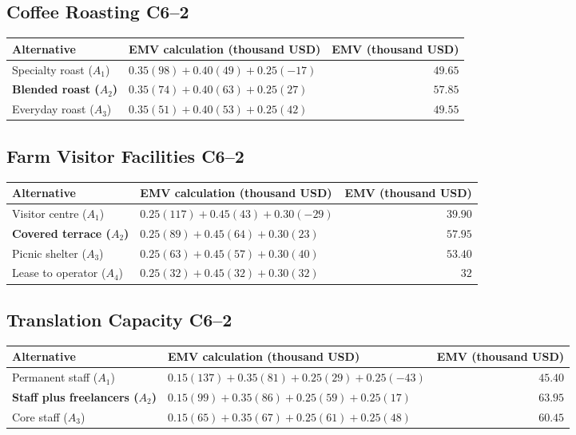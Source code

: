 {\subsection{Coffee Roasting \hfill C6--2}
\label{summary:coffee-roasting}
\begin{center}
\begin{tabular}{@{}llr@{}}\toprule
Alternative & EMV calculation (thousand USD) & EMV (thousand USD)\\\midrule
Specialty roast ($A_1$) & $0.35(98)+0.40(49)+0.25(-17)$ & $49.65$\\
\textbf{Blended roast ($A_2$)} & $0.35(74)+0.40(63)+0.25(27)$ & $\boldsymbol{57.85}$\\
Everyday roast ($A_3$) & $0.35(51)+0.40(53)+0.25(42)$ & $49.55$\\
\bottomrule\end{tabular}
\end{center}
\subsection{Farm Visitor Facilities \hfill C6--2}
\label{summary:farm-visitor-facilities}
\begin{center}
\begin{tabular}{@{}llr@{}}\toprule
Alternative & EMV calculation (thousand USD) & EMV (thousand USD)\\\midrule
Visitor centre ($A_1$) & $0.25(117)+0.45(43)+0.30(-29)$ & $39.90$\\
\textbf{Covered terrace ($A_2$)} & $0.25(89)+0.45(64)+0.30(23)$ & $\boldsymbol{57.95}$\\
Picnic shelter ($A_3$) & $0.25(63)+0.45(57)+0.30(40)$ & $53.40$\\
Lease to operator ($A_4$) & $0.25(32)+0.45(32)+0.30(32)$ & $32$\\
\bottomrule\end{tabular}
\end{center}
\subsection{Translation Capacity \hfill C6--2}
\label{summary:translation-capacity}
\begin{center}
\begin{tabular}{@{}llr@{}}\toprule
Alternative & EMV calculation (thousand USD) & EMV (thousand USD)\\\midrule
Permanent staff ($A_1$) & $0.15(137)+0.35(81)+0.25(29)+0.25(-43)$ & $45.40$\\
\textbf{Staff plus freelancers ($A_2$)} & $0.15(99)+0.35(86)+0.25(59)+0.25(17)$ & $\boldsymbol{63.95}$\\
Core staff ($A_3$) & $0.15(65)+0.35(67)+0.25(61)+0.25(48)$ & $60.45$\\
\bottomrule\end{tabular}
\end{center}
\clearpage
}

